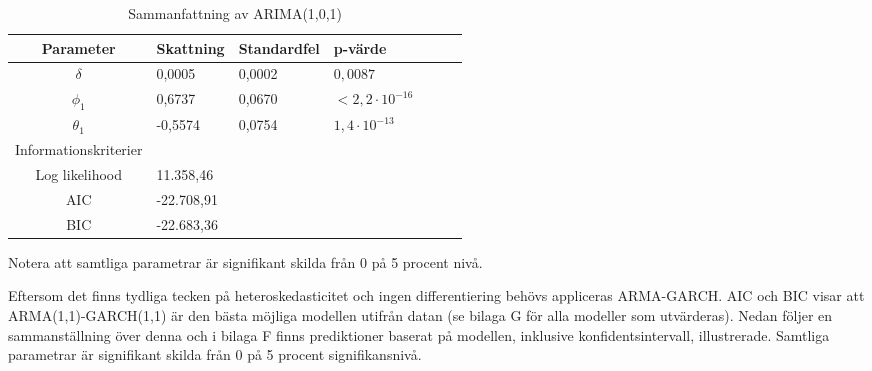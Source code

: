 \documentclass[11pt]{article}
\numberwithin{equation}{section}
\numberwithin{table}{section}
\numberwithin{figure}{section}
\begin{document}
\begin{table}[H]
\caption{Sammanfattning av ARIMA(1,0,1)}
\begin{tabularx}{\textwidth}{c *{6}{Y}}
\toprule

Parameter  & Skattning & Standardfel & p-värde \\
\hline

$\delta$        & 0,0005  & 0,0002  & $0,0087$   \\
$\phi_1$        & 0,6737  & 0,0670  & $<2,2\cdot10^{-16}$   \\

$\theta_1$      & -0,5574 & 0,0754  &  $1,4\cdot10^{-13}$   \\
\midrule

Informationskriterier  & &  &  \\
\hline

Log likelihood        & 11.358,46 \\
AIC                   & -22.708,91 \\

BIC                   & -22.683,36 \\
\bottomrule
\end{tabularx}
\footnotesize{Notera att samtliga parametrar är signifikant skilda från 0 på 5 procent nivå.}
\end{table}


Eftersom det finns tydliga tecken på heteroskedasticitet och ingen differentiering behövs appliceras ARMA-GARCH. AIC och BIC visar att ARMA(1,1)-GARCH(1,1) är den bästa möjliga modellen utifrån datan (se bilaga G för alla modeller som utvärderas). Nedan följer en sammanställning över denna och i bilaga F finns prediktioner baserat på modellen, inklusive konfidentsintervall, illustrerade. Samtliga parametrar är signifikant skilda från 0 på 5 procent signifikansnivå.
\end{document}
